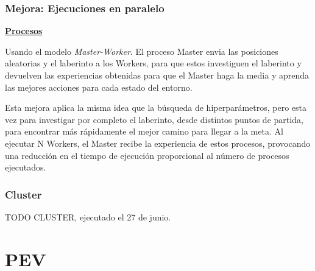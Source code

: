 	
	\subsubsection{Mejora: Ejecuciones en paralelo}
		\begin{flushleft}
		\begin{mdframed}[roundcorner=5pt]		
			\textbf{\underline{Procesos}}
			\vspace{0.1cm}
			
			\scriptsize	
			Usando el modelo \textit{Master-Worker}. El proceso Master envia las posiciones aleatorias y el laberinto a los Workers, para que estos investiguen el laberinto y devuelven las experiencias obtenidas para que el Master haga la media y aprenda las mejores acciones para cada estado del entorno.
		\end{mdframed}
		\end{flushleft}	
		
		Esta mejora aplica la misma idea que la búsqueda de hiperparámetros, pero esta vez para investigar por completo el laberinto, desde distintos puntos de partida, para encontrar más rápidamente el mejor camino para llegar a la meta. Al ejecutar N Workers, el Master recibe la experiencia de estos procesos, provocando una reducción en el tiempo de ejecución proporcional al número de procesos ejecutados.	
		
		
		\newpage
		
	\subsubsection{Cluster}
	
			
		
		\color{blue}
		TODO CLUSTER, ejecutado el 27 de junio.
		\color{black}
		\newpage


\section{PEV}

